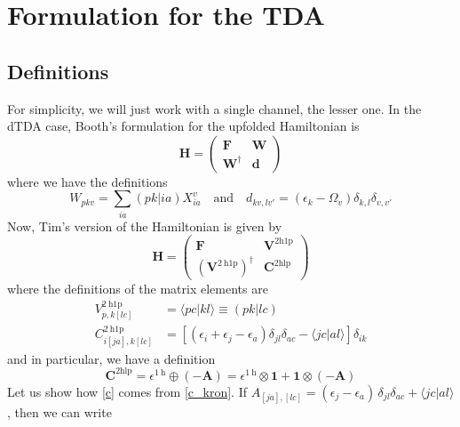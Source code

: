 \section{Formulation for the TDA}
\subsection{Definitions}
For simplicity, we will just work with a single channel, the lesser one. In the dTDA case, Booth's formulation for the upfolded Hamiltonian is
\begin{equation}
    \bm{H} = \begin{pmatrix} \bm{F} & \bm{W} \\ \bm{W}^{\dagger} & \bm{d} \end{pmatrix}
\label{eq:booth_hamiltonian}
\end{equation}
where we have the definitions
\begin{equation}
    W_{pkv} = \sum_{ia} (pk|ia) X_{ia}^{v} \quad \text{and} \quad d_{kv,lv'} = \left(\epsilon_k - \Omega_v\right) \delta_{k,l} \delta_{v,v'}
\label{eq:booth_definitions}
\end{equation}
Now, Tim's version of the Hamiltonian is given by
\begin{equation}
    \bm{H} = \begin{pmatrix} \bm{F} & \bm{V}^{2 \mathrm{h1p}}\\ \left(\bm{V}^{2 \mathrm{~h} 1 \mathrm{p}}\right)^{\dagger} & \bm{C}^{2 \mathrm{hlp}} \end{pmatrix}
\label{eq:tim_hamiltonian}
\end{equation}
where the definitions of the matrix elements are
\begin{align}
    V_{p, k[l c]}^{2 \mathrm{~h} 1 \mathrm{p}} &= \langle p c | k l \rangle \equiv (pk|lc) \\
    C_{i[j a], k[l c]}^{2 \mathrm{~h} 1 \mathrm{p}} &= \left[\left(\epsilon_i+\epsilon_j-\epsilon_a\right) \delta_{j l} \delta_{a c}-\langle j c | a l \rangle\right] \delta_{i k}
\label{c}
\end{align}
and in particular, we have a definition 
\begin{equation}
    \bm{C}^{2 \mathrm{hlp}} = \epsilon^{1 \mathrm{~h}} \oplus (-\bm{A}) = \epsilon^{1 \mathrm{~h}} \otimes \bm{1} + \bm{1} \otimes (-\bm{A})
\label{c_kron}
\end{equation}
Let us show how \ref{c} comes from \ref{c_kron}. If $A_{[ja],[lc]} = (\epsilon_j - \epsilon_a)\, \delta_{jl} \delta_{ac} + \langle jc | al \rangle$, then we can write
